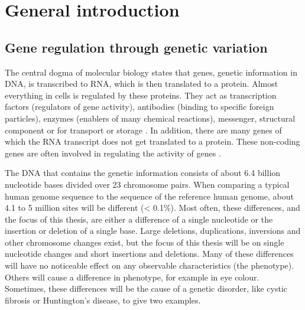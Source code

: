\section{General introduction}
\subsection{Gene regulation through genetic variation}
The central dogma of molecular biology states that  genes, genetic information in DNA, is transcribed to RNA, which is then translated to a protein\cite{crickCentralDogmaMolecular1970}. Almost everything in cells is regulated by these proteins. They act as transcription factors (regulators of gene activity), antibodies (binding to specific foreign particles), enzymes (enablers of many chemical reactions), messenger, structural component or for transport or storage \cite{uzmanMolecularBiologyCell2003}. In addition, there are many genes of which the RNA transcript does not get translated to a protein. These non-coding genes are often involved in regulating the activity of genes \cite{shabalinaMammalianTranscriptomeFunction2004a}. 

The DNA that contains the genetic information consists of about 6.4 billion nucleotide bases divided over 23 chromosome pairs. When comparing a typical human genome sequence to the sequence of the reference human genome, about 4.1 to 5 million sites will be different (< 0.1\%). Most often, these differences, and the focus of this thesis, are either a difference of a single nucleotide or the insertion or deletion of a single base\cite{the1000genomesprojectconsortiumGlobalReferenceHuman2015}. Large deletions, duplications, inversions and other chromosome changes exist, but the focus of this thesis will be on single nucleotide changes and short insertions and deletions. Many of these differences will have no noticeable effect on any observable characteristics (the phenotype). Others will cause a difference in phenotype, for example in eye colour. Sometimes, these differences will be the cause of a genetic disorder, like cystic fibrosis or Huntington’s disease, to give two examples. 

